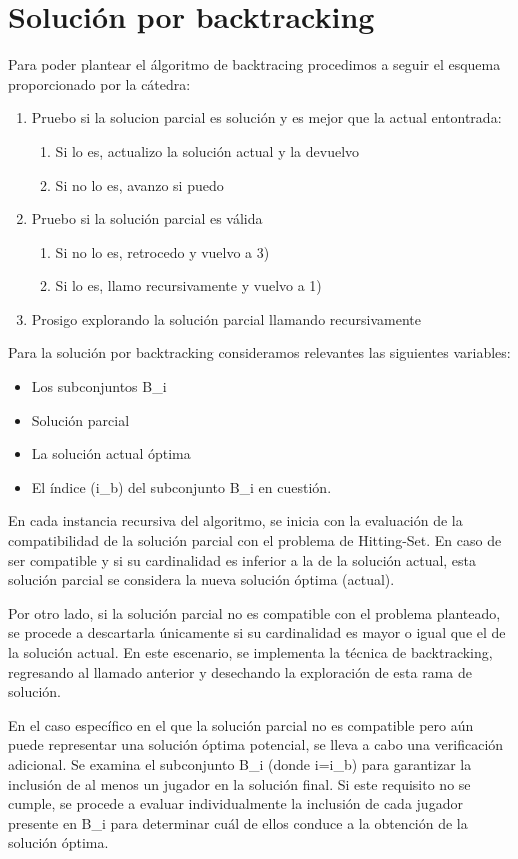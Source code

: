 \section{Solución por backtracking}

Para poder plantear el álgoritmo de backtracing procedimos a seguir el esquema proporcionado por la cátedra:
\begin{enumerate}
    \item Pruebo si la solucion parcial es solución y es mejor que la actual entontrada:
    \begin {enumerate}
        \item Si lo es, actualizo la solución actual y la devuelvo
        \item Si no lo es, avanzo si puedo
    \end{enumerate}
    \item Pruebo si la solución parcial es válida
    \begin {enumerate}
        \item Si no lo es, retrocedo y vuelvo a 3)
        \item Si lo es, llamo recursivamente y vuelvo a 1)
    \end{enumerate}
    \item Prosigo explorando la solución parcial llamando recursivamente
\end{enumerate}

Para la solución por backtracking consideramos relevantes las siguientes variables:
\begin{itemize}
    \item Los subconjuntos B_i
    \item Solución parcial
    \item La solución actual óptima 
    \item El índice (i_b) del subconjunto B_i en cuestión. 
\end{itemize}

En cada instancia recursiva del algoritmo, se inicia con la evaluación de la compatibilidad de la solución parcial con el problema de Hitting-Set. En caso de ser compatible y si su cardinalidad es inferior a la de la solución actual, esta solución parcial se considera la nueva solución óptima (actual).

Por otro lado, si la solución parcial no es compatible con el problema planteado, se procede a descartarla únicamente si su cardinalidad es mayor o igual que el de la solución actual. En este escenario, se implementa la técnica de backtracking, regresando al llamado anterior y desechando la exploración de esta rama de solución.

En el caso específico en el que la solución parcial no es compatible pero aún puede representar una solución óptima potencial, se lleva a cabo una verificación adicional. Se examina el subconjunto B_i (donde i=i_b) para garantizar la inclusión de al menos un jugador en la solución final. Si este requisito no se cumple, se procede a evaluar individualmente la inclusión de cada jugador presente en B_i para determinar cuál de ellos conduce a la obtención de la solución óptima.